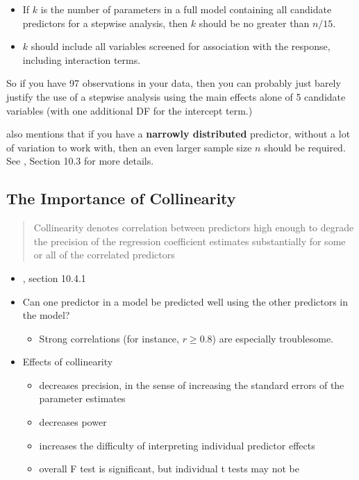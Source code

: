 \documentclass[]{book}
\providecommand{\tightlist}{%
  \setlength{\itemsep}{0pt}\setlength{\parskip}{0pt}}
\theoremstyle{definition}
\theoremstyle{definition}
\theoremstyle{definition}
\theoremstyle{remark}
\begin{document}
\begin{itemize}
\tightlist
\item
  If \(k\) is the number of parameters in a full model containing all
  candidate predictors for a stepwise analysis, then \(k\) should be no
  greater than \(n / 15\).
\item
  \(k\) should include all variables screened for association with the
  response, including interaction terms.
\end{itemize}

So if you have 97 observations in your data, then you can probably just
barely justify the use of a stepwise analysis using the main effects
alone of 5 candidate variables (with one additional DF for the intercept
term.)

\citet{Harrell2001} also mentions that if you have a \textbf{narrowly
distributed} predictor, without a lot of variation to work with, then an
even larger sample size \(n\) should be required. See
\citet{Vittinghoff2012}, Section 10.3 for more details.

\subsection{The Importance of
Collinearity}\label{the-importance-of-collinearity}

\begin{quote}
Collinearity denotes correlation between predictors high enough to
degrade the precision of the regression coefficient estimates
substantially for some or all of the correlated predictors
\end{quote}

\begin{itemize}
\item
  \citet{Vittinghoff2012}, section 10.4.1
\item
  Can one predictor in a model be predicted well using the other
  predictors in the model?

  \begin{itemize}
  \tightlist
  \item
    Strong correlations (for instance, \(r \geq 0.8\)) are especially
    troublesome.
  \end{itemize}
\item
  Effects of collinearity

  \begin{itemize}
  \tightlist
  \item
    decreases precision, in the sense of increasing the standard errors
    of the parameter estimates
  \item
    decreases power
  \item
    increases the difficulty of interpreting individual predictor
    effects
  \item
    overall F test is significant, but individual t tests may not be
  \end{itemize}
\end{itemize}
\end{document}
